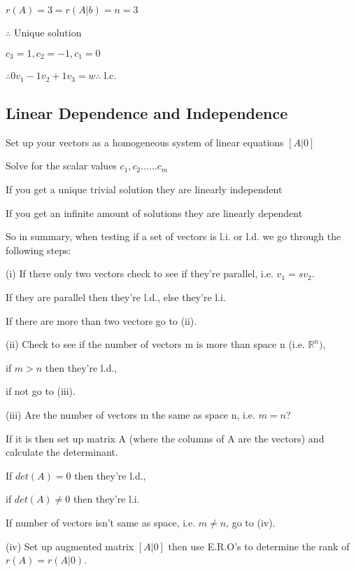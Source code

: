 \documentclass{extarticle}
\begin{document}
\begin{multicols}{2}
$r(A)=3=r(A|b)=n=3$

$\therefore$ Unique solution

$c_3=1,c_2=-1,c_1=0$

$\therefore 0v_1-1v_2+1v_3=w \therefore$ l.c.







\subsection{Linear Dependence and Independence}
Set up your vectors as a homogeneous system of linear equations $[A|0]$

Solve for the scalar values $c_1, c_2...... c_m$

If you get a unique trivial solution they are linearly independent

If you get an infinite amount of solutions they are linearly dependent

\begin{tcolorbox}[enhanced jigsaw,sharp corners,coltext=black,colback=Green!25!white,boxrule=0pt,breakable,size=minimal]
So in summary, when testing if a set of vectors is l.i. or l.d. we go through the following steps:

(i) If there only two vectors check to see if they're parallel, i.e. $v_1 = sv_2$.

If they are parallel then they're l.d., else they're l.i.

If there are more than two vectors go to (ii).

(ii) Check to see if the number of vectors m is more than space n (i.e. ${\mathbb{R}}^n)$, 

if $m > n$ then they're l.d.,

if not go to (iii).

(iii) Are the number of vectors m the same as space n, i.e. $m = n$?

If it is then set up matrix A (where the columns of A are the vectors) and calculate the determinant.

If $det (A) = 0$ then they're l.d.,

if $det (A) \ne 0$ then they're l.i.

If number of vectors isn't same as space, i.e. $m \ne n$, go to (iv).

(iv) Set up augmented matrix $[A|0]$ then use E.R.O's to determine the rank of $r(A) =
r(A|0)$.


\end{tcolorbox}
\end{multicols}
\end{document}
